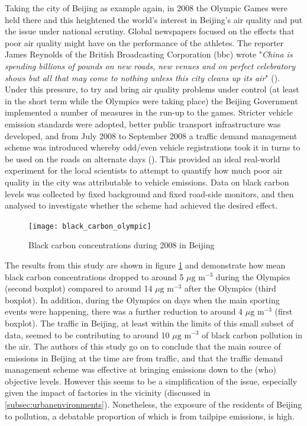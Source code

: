 Taking the city of Beijing as example again, in 2008 the Olympic Games were held there and this heightened the world’s interest in Beijing's air quality and put the issue under national scrutiny. Global newspapers focused on the effects that poor air quality might have on the performance of the athletes. The reporter James Reynolds of the British Broadcasting Corporation (\gls{bbc}) wrote "\textit{China is spending billions of pounds on new roads, new venues and on perfect celebratory shows but all that may come to nothing unless this city cleans up its air}" (\cite{BBC2007}). Under this pressure, to try and bring air quality problems under control (at least in the short term while the Olympics were taking place) the Beijing Government implemented a number of measures in the run-up to the games. Stricter vehicle emission standards were adopted, better public transport infrastructure was developed, and from July 2008 to September 2008 a traffic demand management scheme was introduced whereby odd/even vehicle registrations took it in turns to be used on the roads on alternate days (\cite{Wang2009}). This provided an ideal real-world experiment for the local scientists to attempt to quantify how much poor air quality in the city was attributable to vehicle emissions. Data on black carbon levels was collected by fixed background and fixed road-side monitors, and then analysed to investigate whether the scheme had achieved the desired effect.

\begin{figure}[H]
\centering
\texttt{[image: black\_carbon\_olympic]}
\caption{Black carbon concentrations during 2008 in Beijing}
\label{fig:blackcarbonolympic}
\end{figure}

The results from this study are shown in figure \ref{fig:blackcarbonolympic} and demonstrate how mean black carbon concentrations dropped to around 5 $\mu \text{g m}^{-3}$ during the Olympics (second boxplot) compared to around 14 $\mu \text{g m}^{-3}$ after the Olympics (third boxplot). In addition, during the Olympics on days when the main sporting events were happening, there was a further reduction to around 4 $\mu \text{g m}^{-3}$ (first boxplot). The traffic in Beijing, at least within the limits of this small subset of data, seemed to be contributing to around 10 $\mu \text{g m}^{-3}$ of black carbon pollution in the air. The authors of this study go on to conclude that the main source of emissions in Beijing at the time are from traffic, and that the traffic demand management scheme was effective at bringing emissions down to the (\gls{who}) objective levels. However this seems to be a simplification of the issue, especially given the impact of factories in the vicinity (discussed in \ref{subsec:urbanenvironments}). Nonetheless, the exposure of the residents of Beijing to pollution, a debatable proportion of which is from tailpipe emissions, is high.


